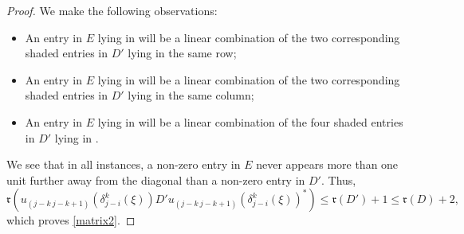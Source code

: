 \documentclass[12pt]{amsart}
\numberwithin{equation}{section}
\theoremstyle{definition}
\theoremstyle{remark}
\begin{document}
\begin{proof}
	We make the following observations:
	\begin{itemize}
		\item An entry in $E$ lying in  will be a linear combination of the two corresponding shaded entries in $D'$ lying in the same row;
		\item An entry in $E$ lying in  will be a linear combination of the two corresponding shaded entries in $D'$ lying in the same column;
		\item An entry in $E$ lying in  will be a linear combination of the four shaded entries in $D'$ lying in .
	\end{itemize}
	We see that in all instances, a non-zero entry in $E$ never appears more than one unit further away from the diagonal than a non-zero entry in $D'$. Thus,	
	$$
	\mathfrak{r}(u_{(j-k \ j-k+1)}(\delta_{j-i}^{k}(\xi))D'u_{(j-k \ j-k+1)}(\delta_{j-i}^{k}(\xi))^{*})\leq \mathfrak{r}(D')+1\leq\mathfrak{r}(D)+2,
	$$
	which proves \autoref{matrix2}. 
\end{proof}
\end{document}

